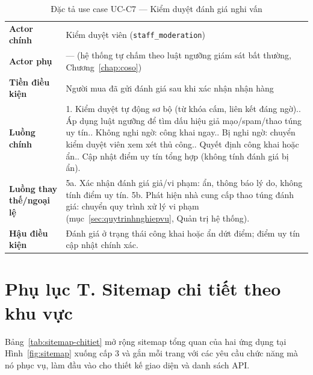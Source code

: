 \begingroup
\tblsetup
\begin{longtable}{L{3.00cm} L{12.25cm}}
\caption{Đặc tả use case UC-C7 --- Kiểm duyệt đánh giá nghi vấn}
\label{tab:uc-c7} \\
\toprule
{}
 \\
\midrule
\endfirsthead
\bottomrule
\endfoot
\textbf{Actor chính} & Kiểm duyệt viên (\texttt{staff\_moderation}) \\
\textbf{Actor phụ} & --- (hệ thống tự chấm theo luật ngưỡng giám sát bất thường, Chương~\ref{chap:coso}) \\
\textbf{Tiền điều kiện} & Người mua đã gửi đánh giá sau khi xác nhận nhận hàng \\
\textbf{Luồng chính} &
1. Kiểm duyệt tự động sơ bộ (từ khóa cấm, liên kết đáng ngờ).. Áp dụng luật ngưỡng để tìm dấu hiệu giả mạo/spam/thao túng uy tín.. Không nghi ngờ: công khai ngay.. Bị nghi ngờ: chuyển kiểm duyệt viên xem xét thủ công.. Quyết định công khai hoặc ẩn.. Cập nhật điểm uy tín tổng hợp (không tính đánh giá bị ẩn). \\
\textbf{Luồng thay thế/ngoại lệ} &
5a. Xác nhận đánh giá giả/vi phạm: ẩn, thông báo lý do, không tính điểm uy tín.\newline
5b. Phát hiện nhà cung cấp thao túng đánh giá: chuyển quy trình xử lý vi phạm (mục~\ref{sec:quytrinhnghiepvu}, Quản trị hệ thống). \\
\textbf{Hậu điều kiện} & Đánh giá ở trạng thái công khai hoặc ẩn dứt điểm; điểm uy tín cập nhật chính xác. \\
\end{longtable}
\endgroup

\clearpage
\section*{Phụ lục T. Sitemap chi tiết theo khu vực}
\label{apdx:sitemap}

Bảng~\ref{tab:sitemap-chitiet} mở rộng sitemap tổng quan của hai ứng dụng tại Hình~\ref{fig:sitemap} xuống cấp 3 và gắn mỗi trang với các yêu cầu chức năng mà nó phục vụ, làm đầu vào cho thiết kế giao diện và danh sách API.

